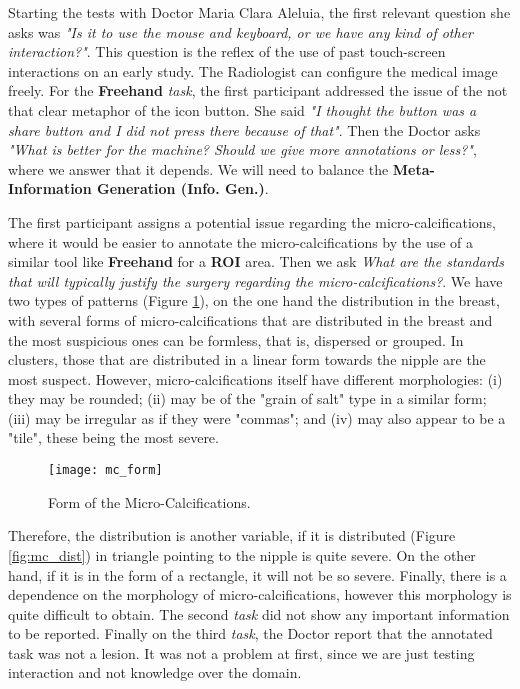 \clearpage

Starting the tests with Doctor Maria Clara Aleluia, the first relevant question she asks was \textit{"Is it to use the mouse and keyboard, or we have any kind of other interaction?"}. This question is the reflex of the use of past touch-screen \cite{Calisto:2017:TTM:3132272.3134111} interactions on an early study. The Radiologist can configure the medical image freely. For the \textbf{Freehand} \textit{task}, the first participant addressed the issue of the not that clear metaphor of the icon button. She said \textit{"I thought the button was a share button and I did not press there because of that"}. Then the Doctor asks \textit{"What is better for the machine? Should we give more annotations or less?"}, where we answer that it depends. We will need to balance the \textbf{Meta-Information Generation (Info. Gen.)}.

The first participant assigns a potential issue regarding the micro-calcifications, where it would be easier to annotate the micro-calcifications by the use of a similar tool like \textbf{Freehand} for a \textbf{ROI} area. Then we ask \textit{What are the standards that will typically justify the surgery regarding the micro-calcifications?}. We have two types of patterns (Figure \ref{fig:mc_form}), on the one hand the distribution in the breast, with several forms of micro-calcifications \cite{bassett1992mammographic, shen1994application, yu2000cad} that are distributed in the breast and the most suspicious ones can be formless, that is, dispersed or grouped. In clusters, those that are distributed in a linear form towards the nipple are the most suspect. However, micro-calcifications itself have different morphologies: (i) they may be rounded; (ii) may be of the "grain of salt" type in a similar form; (iii) may be irregular as if they were "commas"; and (iv) may also appear to be a "tile", these being the most severe.


\hfill

\begin{figure}[h]
\centering
\texttt{[image: mc\_form]}
\caption{Form of the Micro-Calcifications.}
\label{fig:mc_form}
\end{figure}

\hfill


Therefore, the distribution \cite{berg2002does, chan1987image} is another variable, if it is distributed (Figure \ref{fig:mc_dist}) in triangle pointing to the nipple is quite severe. On the other hand, if it is in the form of a rectangle, it will not be so severe. Finally, there is a dependence on the morphology of micro-calcifications, however this morphology is quite difficult to obtain. The second \textit{task} did not show any important information to be reported. Finally on the third \textit{task}, the Doctor report that the annotated task was not a lesion. It was not a problem at first, since we are just testing interaction and not knowledge over the domain.


